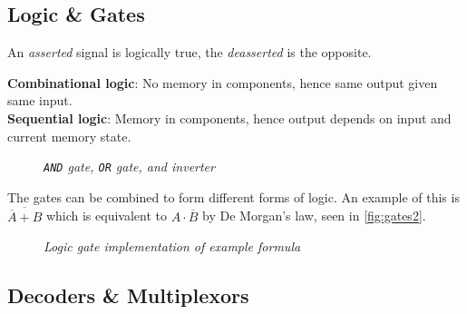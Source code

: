 \documentclass[11pt]{article}
\begin{document}
\subsection*{Logic \& Gates}
An \textit{asserted} signal is logically true, the \textit{deasserted} is the opposite.

\begin{tcolorbox}[
    enhanced,
    attach boxed title to top left={xshift=6mm,yshift=-1.5mm},
    colback=moonstoneblue!20,
    colframe=moonstoneblue,
    colbacktitle=moonstoneblue,
    title=Two types of logic systems,
    fonttitle=\bfseries\color{white},
    boxed title style={size=small,colframe=moonstoneblue,sharp corners},
    sharp corners,
    label=box:logic-types,
]
    {\color{moondark}\textbf{Combinational logic}}: No memory in components, hence same output given same input. \\
    {\color{moondark}\textbf{Sequential logic}}: Memory in components, hence output depends on input and current memory state.
\end{tcolorbox}

\begin{figure}[htbp]
    \centering
    \caption{\textit{\texttt{AND} gate, \texttt{OR} gate, and inverter}}
\end{figure}

The gates can be combined to form different forms of logic. An example of this is $\overline{\overline{A} + B}$ which is equivalent to $A \cdot \overline{B}$ by De Morgan's law, seen in \autoref{fig:gates2}.

\begin{figure}[htbp]
    \centering
    \caption{\textit{Logic gate implementation of example formula}}
    \label{fig:gates2}
\end{figure}

\subsection*{Decoders \& Multiplexors}
\end{document}
